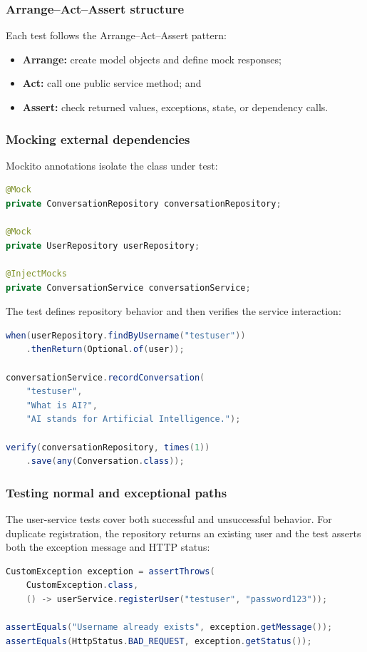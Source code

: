 \documentclass[11pt,a4paper]{article}
\begin{document}
\subsubsection{Arrange--Act--Assert structure}

Each test follows the Arrange--Act--Assert pattern:
\begin{itemize}[leftmargin=2em]
  \item \textbf{Arrange:} create model objects and define mock responses;
  \item \textbf{Act:} call one public service method; and
  \item \textbf{Assert:} check returned values, exceptions, state, or dependency calls.
\end{itemize}

\subsubsection{Mocking external dependencies}

Mockito annotations isolate the class under test:
\begin{lstlisting}[language=Java]
@Mock
private ConversationRepository conversationRepository;

@Mock
private UserRepository userRepository;

@InjectMocks
private ConversationService conversationService;
\end{lstlisting}

The test defines repository behavior and then verifies the service interaction:
\begin{lstlisting}[language=Java]
when(userRepository.findByUsername("testuser"))
    .thenReturn(Optional.of(user));

conversationService.recordConversation(
    "testuser",
    "What is AI?",
    "AI stands for Artificial Intelligence.");

verify(conversationRepository, times(1))
    .save(any(Conversation.class));
\end{lstlisting}

\subsubsection{Testing normal and exceptional paths}

The user-service tests cover both successful and unsuccessful behavior. For duplicate
registration, the repository returns an existing user and the test asserts both the
exception message and HTTP status:
\begin{lstlisting}[language=Java]
CustomException exception = assertThrows(
    CustomException.class,
    () -> userService.registerUser("testuser", "password123"));

assertEquals("Username already exists", exception.getMessage());
assertEquals(HttpStatus.BAD_REQUEST, exception.getStatus());
\end{lstlisting}
\end{document}
